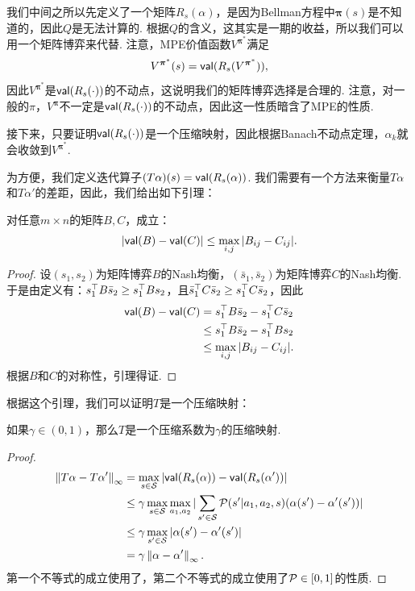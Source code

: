 我们中间之所以先定义了一个矩阵$R_s(\alpha)$，是因为Bellman方程中$\boldsymbol{\pi}(s)$是不知道的，因此$Q$是无法计算的. 根据$Q$的含义，这其实是一期的收益，所以我们可以用一个矩阵博弈来代替. 注意，MPE价值函数$V^{\boldsymbol \pi^*}$满足
\[V^{\boldsymbol \pi^*}(s)=\mathsf{val}(R_s(V^{\boldsymbol \pi^*})),\]
因此$V^{\boldsymbol \pi^*}$是$\mathsf{val}(R_s(\cdot))$的不动点，这说明我们的矩阵博弈选择是合理的. 注意，对一般的$\pi$，$V^{\boldsymbol \pi}$不一定是$\mathsf{val}(R_s(\cdot))$的不动点，因此这一性质暗含了MPE的性质. 

接下来，只要证明$\mathsf{val}(R_s(\cdot))$是一个压缩映射，因此根据Banach不动点定理，$\alpha_k$就会收敛到$V^{\boldsymbol \pi^*}$.

为方便，我们定义迭代算子$(T\alpha)(s) = \mathsf{val}(R_s(\alpha))$. 我们需要有一个方法来衡量$T\alpha$和$T\alpha'$的差距，因此，我们给出如下引理：

\begin{lemma}\label{lemma:matrix-game}
对任意$m\times n$的矩阵$B,C$，成立：
\[|\mathsf{val}(B)-\mathsf{val}(C)| \leq \max_{i,j}|B_{ij} - C_{ij}|.\]
\end{lemma}

\begin{proof}
设$(s_1,s_2)$为矩阵博弈$B$的Nash均衡，$(\bar{s}_1,\bar{s}_2)$为矩阵博弈$C$的Nash均衡. 于是由定义有：$s_1^\top B\bar{s}_2  \ge s_1^\top  B s_2$，且$\bar{s}_1 ^\top  C\bar{s}_2 \ge s_1^\top  C \bar{s}_2 $，因此
\begin{align*}
    \mathsf{val}(B)-\mathsf{val}(C) &= s_1^\top B\bar{s}_2 - s_1^\top  C\bar{s}_2 \\
    &\leq s_1^\top  B\bar{s}_2  - s_1^\top  B s_2 \\
    &\leq \max_{i,j}|B_{ij} - C_{ij}|.
\end{align*}
根据$B$和$C$的对称性，引理得证.
\end{proof}

根据这个引理，我们可以证明$T$是一个压缩映射：

\begin{lemma}
    如果$\gamma\in(0,1)$，那么$T$是一个压缩系数为$\gamma$的压缩映射.
\end{lemma}
\begin{proof}
\begin{align*}
    \left\|T\alpha-T\alpha'\right\|_\infty &= \max_{s\in \mathcal S}|\mathsf{val} (R_s(\alpha)) - \mathsf{val}(R_s(\alpha'))| \\
    &\leq \gamma \max_{s\in \mathcal S} \max_{a_1,a_2}|\sum_{s'\in \mathcal S}\mathcal P(s'|a_1,a_2,s)(\alpha(s') - \alpha'(s'))| \\
    &\leq \gamma \max_{s'\in \mathcal S} |\alpha(s') - \alpha'(s')| \\
    &= \gamma \left\|\alpha-\alpha'\right\|_\infty.
\end{align*}
第一个不等式的成立使用了，第二个不等式的成立使用了$\mathcal P\in[0,1]$的性质. 
\end{proof}

